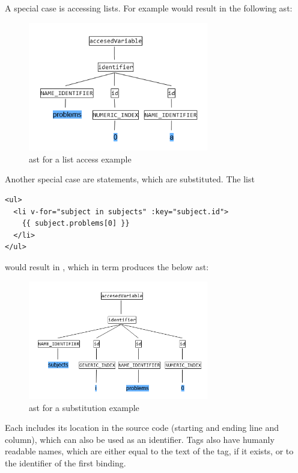 A special case is accessing lists. For example  would result in the following \gls{ast}:

\begin{figure}[H]
    \centering
    \includegraphics[width=0.7\textwidth]{images/ast_problems_0_a.png}
     \caption{\gls{ast} for a list access example }
     \label{fig:ast_list_simple}
\end{figure}
Another special case are  statements, which are substituted. The list
\begin{lstlisting}[style=html]
<ul>
  <li v-for="subject in subjects" :key="subject.id">
    {{ subject.problems[0] }}
  </li>
</ul>
\end{lstlisting}
would result in , which in term produces the below \gls{ast}:

\begin{figure}[H]
    \centering
    \includegraphics[width=0.7\textwidth]{images/ast_numeric_generic.png}
     \caption{\gls{ast} for a  substitution example }
     \label{fig:ast_list_complex}
\end{figure}

Each  includes its location in the source code (starting and ending line and column), which can also be used as an identifier. Tags also have humanly readable names, which are either equal to the text of the tag, if it exists, or to the identifier of the first binding. 

